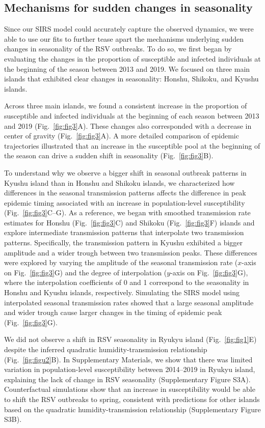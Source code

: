 \documentclass[12pt]{article}
\newcommand{\fref}[1]{Fig.~\ref{fig:#1}}
\begin{document}
\subsection*{Mechanisms for sudden changes in seasonality}

Since our SIRS model could accurately capture the observed dynamics, we were able to use our fits to further tease apart the mechanisms underlying sudden changes in seasonality of the RSV outbreaks.
To do so, we first began by evaluating the changes in the proportion of susceptible and infected individuals at the beginning of the season between 2013 and 2019.
We focused on three main islands that exhibited clear changes in seasonality: Honshu, Shikoku, and Kyushu islands. 

Across three main islands, we found a consistent increase in the proportion of susceptible and infected individuals at the beginning of each season between 2013 and 2019 (\fref{fig3}A).
These changes also corresponded with a decrease in center of gravity (\fref{fig3}A).
A more detailed comparison of epidemic trajectories illustrated that an increase in the susceptible pool at the beginning of the season can drive a sudden shift in seasonality (\fref{fig3}B).

To understand why we observe a bigger shift in seasonal outbreak patterns in Kyushu island than in Honshu and Shikoku islands, we characterized how differences in the seasonal transmission patterns affects the difference in peak epidemic timing associated with an increase in population-level susceptibility (\fref{fig3}C--G).
As a reference, we began with smoothed transmission rate estimates for Honshu (\fref{fig3}C) and Shikoku (\fref{fig3}F) islands and explore intermediate transmission patterns that interpolate two transmission patterns.
Specifically, the transmission pattern in Kyushu exhibited a bigger amplitude and a wider trough between two transmission peaks.
These differences were explored by varying the amplitude of the seasonal transmission rate ($x$-axis on \fref{fig3}G) and the degree of interpolation ($y$-axis on \fref{fig3}G), where the interpolation coefficients of 0 and 1 correspond to the seasonality in Honshu and Kyushu islands, respectively.
Simulating the SIRS model using interpolated seasonal transmission rates showed that a large seasonal amplitude and wider trough cause larger changes in the timing of epidemic peak (\fref{fig3}G). 

We did not observe a shift in RSV seasonality in Ryukyu island (\fref{fig1}E) despite the inferred quadratic humidity-transmission relationship (\fref{figu2}B).
In Supplementary Materials, we show that there was limited variation in population-level susceptibility between 2014--2019 in Ryukyu island, explaining the lack of change in RSV seasonality (Supplementary Figure S3A).
Counterfactual simulations show that an increase in susceptibility would be able to shift the RSV outbreaks to spring, consistent with predictions for other islands based on the quadratic humidity-transmission relationship (Supplementary Figure S3B).
\end{document}
